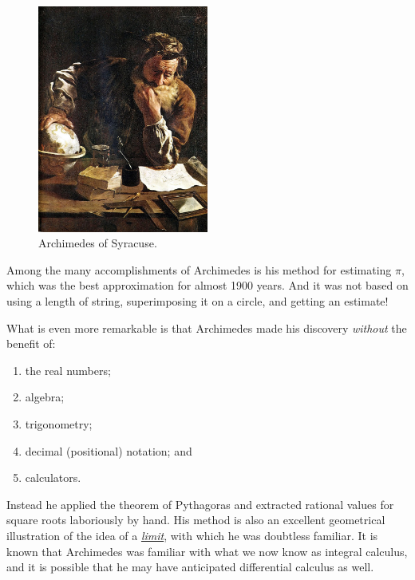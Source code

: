 \documentclass[
  a4paper,
]{article}
\begin{document}
\begin{figure}
\centering
\includegraphics[width=0.5\textwidth,height=\textheight]{images/Domenico-Fetti_Archimedes_1620.jpg}
\caption[Archimedes of Syracuse.]{Archimedes of
Syracuse.\footnotemark{}}\label{fig:archimedes}
\end{figure}

Among the many accomplishments of Archimedes is his method for
estimating \(\pi\), which was the best approximation for almost 1900
years. And it was not based on using a length of string, superimposing
it on a circle, and getting an estimate! \normalfont 

What is even more remarkable is that Archimedes made his discovery
\emph{without} the benefit of:

\begin{enumerate}
\def\labelenumi{(\alph{enumi})}
\item
  the real numbers;
\item
  algebra;
\item
  trigonometry;
\item
  decimal (positional) notation; and
\item
  calculators.
\end{enumerate}

Instead he applied the theorem of Pythagoras and extracted rational
values for square roots laboriously by hand. His method is also an
excellent geometrical illustration of the idea of a
\href{https://www.britannica.com/science/limit-mathematics}{\emph{limit}},
with which he was doubtless familiar. It is known that Archimedes was
familiar with what we now know as integral calculus, and it is possible
that he may have anticipated differential calculus as well.
\end{document}
